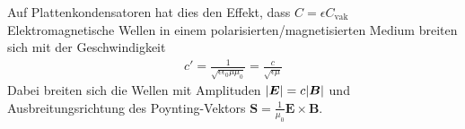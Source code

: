 Auf Plattenkondensatoren hat dies den Effekt, dass $C = \epsilon C_{\text{vak}}$\\
Elektromagnetische Wellen in einem polarisierten/magnetisierten Medium breiten sich mit der Geschwindigkeit 
\begin{align*}
    c' = \frac{1}{\sqrt{\epsilon\epsilon_0\mu\mu_0}} = \frac{c}{\sqrt{\epsilon \mu}}
\end{align*}
Dabei breiten sich die Wellen mit Amplituden $\vert\bm{E}\vert = c \vert\bm{B}\vert$ und Ausbreitungsrichtung des Poynting-Vektors $\bm{S} = \frac{1}{\mu_0} \bm{E} \times \bm{B}$. 